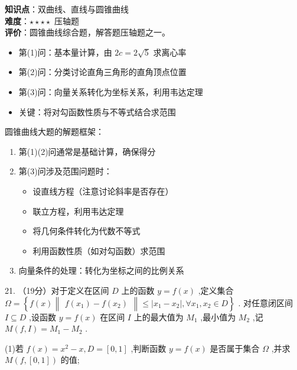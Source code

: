 \documentclass[10pt]{article}
\begin{document}
\begin{analysisbox}[考点分析]
\textbf{知识点}：双曲线、直线与圆锥曲线\\
\textbf{难度}：\(\star\star\star\star\) 压轴题\\
\textbf{评价}：圆锥曲线综合题，解答题压轴题之一。
\begin{itemize}
\item 第(1)问：基本量计算，由 \(2c = 2\sqrt{5}\) 求离心率
\item 第(2)问：分类讨论直角三角形的直角顶点位置
\item 第(3)问：向量关系转化为坐标关系，利用韦达定理
\item 关键：将对勾函数性质与不等式结合求范围
\end{itemize}
\end{analysisbox}

\begin{tipbox}[教学提示]
圆锥曲线大题的解题框架：
\begin{enumerate}
\item 第(1)(2)问通常是基础计算，确保得分
\item 第(3)问涉及范围问题时：
  \begin{itemize}
  \item 设直线方程（注意讨论斜率是否存在）
  \item 联立方程，利用韦达定理
  \item 将几何条件转化为代数不等式
  \item 利用函数性质（如对勾函数）求范围
  \end{itemize}
\item 向量条件的处理：转化为坐标之间的比例关系
\end{enumerate}
\end{tipbox}

\newpage

21. （19分）对于定义在区间 \(D\) 上的函数 \(y = f\left( x\right)\) ,定义集合 \(\Omega  = \left\{  {f\left( x\right) \begin{Vmatrix}{f\left( {x}_{1}\right)  - f\left( {x}_{2}\right) }\end{Vmatrix} \leq  \left| {{x}_{1} - {x}_{2}}\right| ,\forall {x}_{1},{x}_{2} \in  D}\right\}\) . 对任意闭区间 \(I \subseteq  D\) ,设函数 \(y = f\left( x\right)\) 在区间 \(I\) 上的最大值为 \({M}_{1}\) ,最小值为 \({M}_{2}\) ,记 \(M\left( {f,I}\right)  = {M}_{1} - {M}_{2}\) .

(1)若 \(f\left( x\right)  = {x}^{2} - x,D = \left\lbrack  {0,1}\right\rbrack\) ,判断函数 \(y = f\left( x\right)\) 是否属于集合 \(\Omega\) ,并求 \(M\left( {f,\left\lbrack  {0,1}\right\rbrack  }\right)\) 的值;
\end{document}
